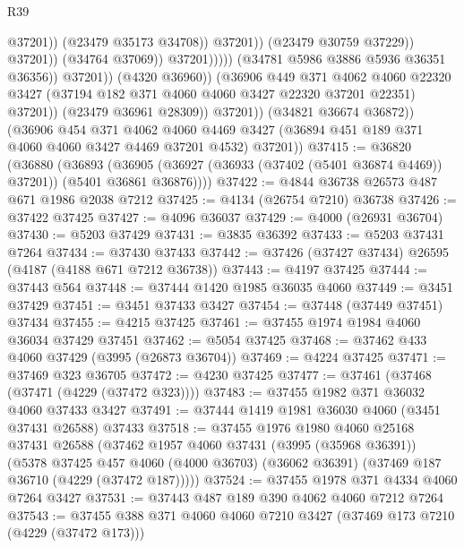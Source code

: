 \begin{lexlean}{R39}
\begin{coremodule}
                                                    @37201))
                                                (@23479 @35173 @34708))
                                              @37201))
                                          (@23479 @30759 @37229))
                                        @37201))
                                    (@34764 @37069))
                                  @37201)))))
                        (@34781 @5986 @3886 @5936 @36351 @36356))
                      @37201))
                  (@4320 @36960))
                (@36906
                  @449
                  @371
                  @4062
                  @4060
                  @22320
                  @3427
                  (@37194 @182 @371 @4060 @4060 @3427 @22320 @37201 @22351)
                  @37201))
              (@23479 @36961 @28309))
            @37201))
        (@34821 @36674 @36872))
      (@36906
        @454
        @371
        @4062
        @4060
        @4469
        @3427
        (@36894 @451 @189 @371 @4060 @4060 @3427 @4469 @37201 @4532)
        @37201))
@37415 := @36820
    (@36880
      (@36893
        (@36905 (@36927 (@36933 (@37402 (@5401 @36874 @4469)) @37201)) (@5401 @36861 @36876))))
@37422 := @4844 @36738 @26573 @487 @671 @1986 @2038 @7212
@37425 := @4134 (@26754 @7210) @36738
@37426 := @37422 @37425
@37427 := @4096 @36037
@37429 := @4000 (@26931 @36704)
@37430 := @5203 @37429
@37431 := @3835 @36392
@37433 := @5203 @37431 @7264
@37434 := @37430 @37433
@37442 := @37426 (@37427 @37434) @26595 (@4187 (@4188 @671 @7212 @36738))
@37443 := @4197 @37425
@37444 := @37443 @564
@37448 := @37444 @1420 @1985 @36035 @4060
@37449 := @3451 @37429
@37451 := @3451 @37433 @3427
@37454 := @37448 (@37449 @37451) @37434
@37455 := @4215 @37425
@37461 := @37455 @1974 @1984 @4060 @36034 @37429 @37451
@37462 := @5054 @37425
@37468 := @37462 @433 @4060 @37429 (@3995 (@26873 @36704))
@37469 := @4224 @37425
@37471 := @37469 @323 @36705
@37472 := @4230 @37425
@37477 := @37461 (@37468 (@37471 (@4229 (@37472 @323))))
@37483 := @37455 @1982 @371 @36032 @4060 @37433 @3427
@37491 := @37444 @1419 @1981 @36030 @4060 (@3451 @37431 @26588) @37433
@37518 := @37455
    @1976
    @1980
    @4060
    @25168
    @37431
    @26588
    (@37462
      @1957
      @4060
      @37431
      (@3995 (@35968 @36391))
      (@5378
        @37425
        @457
        @4060
        (@4000 @36703)
        (@36062 @36391)
        (@37469 @187 @36710 (@4229 (@37472 @187)))))
@37524 := @37455 @1978 @371 @4334 @4060 @7264 @3427
@37531 := @37443 @487 @189 @390 @4062 @4060 @7212 @7264
@37543 := @37455 @388 @371 @4060 @4060 @7210 @3427 (@37469 @173 @7210 (@4229 (@37472 @173)))

\end{coremodule}
\end{lexlean}
